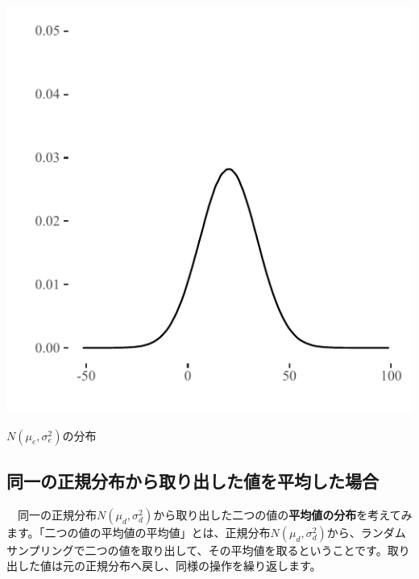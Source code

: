 \documentclass[]{tufte-handout}
\begin{document}
\begin{marginfigure}

{\centering \includegraphics{AdditivityOfVariance_files/figure-latex/unnamed-chunk-9-1} 

}

\caption[$N(\mu_e, \sigma^2_e)$の分布]{$N(\mu_e, \sigma^2_e)$の分布}\label{fig:unnamed-chunk-9}
\end{marginfigure}

\newpage

\hypertarget{ux540cux4e00ux306eux6b63ux898fux5206ux5e03ux304bux3089ux53d6ux308aux51faux3057ux305fux5024ux3092ux5e73ux5747ux3057ux305fux5834ux5408}{%
\subsection{\texorpdfstring{\textbf{同一の正規分布から取り出した値を平均した場合}}{同一の正規分布から取り出した値を平均した場合}}\label{ux540cux4e00ux306eux6b63ux898fux5206ux5e03ux304bux3089ux53d6ux308aux51faux3057ux305fux5024ux3092ux5e73ux5747ux3057ux305fux5834ux5408}}

　同一の正規分布\(N(\mu_d, \sigma^2_d)\)から取り出した二つの値の\textbf{平均値の分布}を考えてみます。「二つの値の平均値の平均値」とは、正規分布\(N(\mu_d, \sigma^2_d)\)から、ランダムサンプリングで二つの値を取り出して、その平均値を取るということです。取り出した値は元の正規分布へ戻し、同様の操作を繰り返します。
\end{document}
